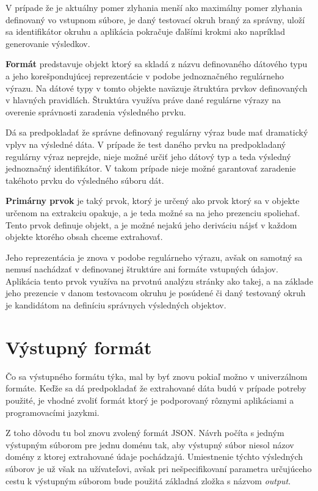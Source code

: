 V prípade že je aktuálny pomer zlyhania menší ako maximálny pomer zlyhania definovaný vo vstupnom súbore, je daný testovací okruh braný za správny, uloží sa identifikátor okruhu a aplikácia pokračuje ďalšími krokmi ako napríklad generovanie výsledkov.

\bigskip

\textbf{Formát} predstavuje objekt ktorý sa skladá z názvu definovaného dátového typu a jeho korešpondujúcej reprezentácie v podobe jednoznačného regulárneho výrazu. Na dátové typy v tomto objekte naväzuje štruktúra prvkov definovaných v hlavných pravidlách. Štruktúra využíva práve dané regulárne výrazy na overenie správnosti zaradenia výsledného prvku.

Dá sa predpokladať že správne definovaný regulárny výraz bude mať dramatický vplyv na výsledné dáta. V prípade že test daného prvku na predpokladaný regulárny výraz neprejde, nieje možné určiť jeho dátový typ a teda výsledný jednoznačný identifikátor. V takom prípade nieje možné garantovať zaradenie takéhoto prvku do výsledného súboru dát.

\newpage

\textbf{Primárny prvok} je taký prvok, ktorý je určený ako prvok ktorý sa v objekte určenom na extrakciu opakuje, a je teda možné sa na jeho prezenciu spoliehať. Tento prvok definuje objekt, a je možné nejakú jeho deriváciu nájsť v každom objekte ktorého obsah chceme extrahovať. 

Jeho reprezentácia je znova v podobe regulárneho výrazu, avšak on samotný sa nemusí nachádzať v definovanej štruktúre ani formáte vstupných údajov. Aplikácia tento prvok využíva na prvotnú analýzu stránky ako takej, a na základe jeho prezencie v danom testovacom okruhu je posúdené či daný testovaný okruh je kandidátom na definíciu správnych výsledných objektov.


\section{Výstupný formát}

Čo sa výstupného formátu týka, mal by byť znovu pokiaľ možno v univerzálnom formáte. Keďže sa dá predpokladať že extrahované dáta budú v prípade potreby použité, je vhodné zvoliť formát ktorý je podporovaný rôznymi aplikáciami a programovacími jazykmi.

Z toho dôvodu tu bol znovu zvolený formát JSON. Návrh počíta s jedným výstupným súborom pre jednu doménu tak, aby výstupný súbor niesol názov domény z ktorej extrahované údaje pochádzajú. Umiestnenie týchto výsledných súborov je už však na užívateľovi, avšak pri nešpecifikovaní parametra určujúceho cestu k výstupným súborom bude použitá základná zložka s názvom \textit{output}.

